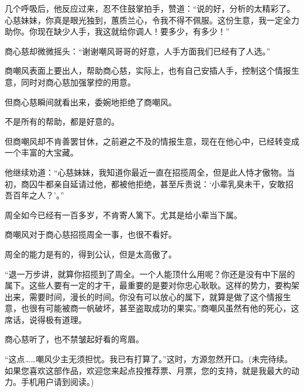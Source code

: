 \begin{this_body}
几个呼吸后，他反应过来，忍不住鼓掌拍手，赞道：“说的好，分析的太精彩了。心慈妹妹，你真是眼光独到，蕙质兰心，令我不得不佩服。这份生意，我一定全力助你。你现在缺少人手，我这就给你调人！要多少，有多少！”

商心慈却微微摇头：“谢谢嘲风哥哥的好意，人手方面我们已经有了人选。”

商嘲风表面上要出人，帮助商心慈，实际上，也有自己安插人手，控制这个情报生意，同时对商心慈加强掌控的用意。

但商心慈瞬间就看出来，委婉地拒绝了商嘲风。

不是所有的帮助，都是好意的。

但商嘲风却不肯善罢甘休，之前避之不及的情报生意，现在在他心中，已经转变成一个丰富的大宝藏。

他继续劝道：“心慈妹妹，我知道你最近一直在招揽周全，但是此人恃才傲物。当初，商囚牛都亲自延请过他，都被他拒绝，甚至斥责说：‘小辈乳臭未干，安敢招吾百年之人？’。”

周全如今已经有一百多岁，不肯寄人篱下。尤其是给小辈当下属。

商嘲风对于商心慈招揽周全一事，也很不看好。

周全的能力是有的，得到公认，但是太高傲了。

“退一万步讲，就算你招揽到了周全。一个人能顶什么用呢？你还是没有中下层的属下。这些人要有一定的才干，最重要的是要对你忠心耿耿。这样的势力，要构架出来，需要时间，漫长的时间。你没有可以放心的属下，就算是做了这个情报生意，也很有可能被商一帆破坏，甚至盗取成功的果实。”商嘲风虽然有他的死心，这席话，说得极有道理。

商心慈听了，也不禁皱起好看的弯眉。

“这点……嘲风少主无须担忧。我已有打算了。”这时，方源忽然开口。(未完待续。如果您喜欢这部作品，欢迎您来起点投推荐票、月票，您的支持，就是我最大的动力。手机用户请到阅读。)

\end{this_body}

